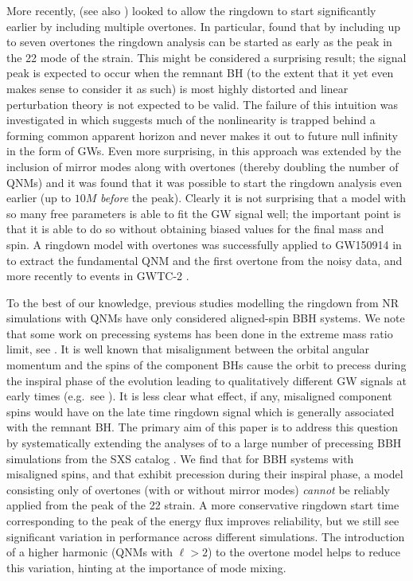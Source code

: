 More recently, \cite{overtones} (see also \cite{2020PhRvD.101j4005O}) looked to allow the ringdown to start significantly earlier by including multiple overtones. 
In particular, \cite{overtones} found that by including up to seven overtones the ringdown analysis can be started as early as the peak in the 22 mode of the strain. 
This might be considered a surprising result; the signal peak is expected to occur when the remnant BH (to the extent that it yet even makes sense to consider it as such) is most highly distorted and linear perturbation theory is not expected to be valid. 
The failure of this intuition was investigated in \cite{2020arXiv200400671O} which suggests much of the nonlinearity is trapped behind a forming common apparent horizon and never makes it out to future null infinity in the form of GWs. 
Even more surprising, in \cite{mirror_modes} this approach was extended by the inclusion of mirror modes along with overtones (thereby doubling the number of QNMs) and it was found that it was possible to start the ringdown analysis even earlier (up to ${10M}$ \emph{before} the peak). 
Clearly it is not surprising that a model with so many free parameters is able to fit the GW signal well; the important point is that it is able to do so without obtaining biased values for the final mass and spin. 
A ringdown model with overtones was successfully applied to GW150914 in \cite{tnh} to extract the fundamental QNM and the first overtone from the noisy data, and more recently to events in GWTC-2 \cite{gwtc-2_tests}. 

To the best of our knowledge, previous studies modelling the ringdown from NR simulations with QNMs have only considered aligned-spin BBH systems. 
We note that some work on precessing systems has been done in the extreme mass ratio limit, see \cite{2019PhRvL.123p1101H,2019PhRvD.100h4032L}. 
It is well known that misalignment between the orbital angular momentum and the spins of the component BHs cause the orbit to precess during the inspiral phase of the evolution leading to qualitatively different GW signals at early times (e.g.\ see \cite{1994PhRvD..49.6274A}). 
It is less clear what effect, if any, misaligned component spins would have on the late time ringdown signal which is generally associated with the remnant BH. 
The primary aim of this paper is to address this question by systematically extending the analyses of \cite{overtones, mirror_modes} to a large number of precessing BBH simulations from the SXS catalog \cite{sxs, 2013PhRvL.111x1104M}. 
We find that for BBH systems with misaligned spins, and that exhibit precession during their inspiral phase, a model consisting only of overtones (with or without mirror modes) \emph{cannot} be reliably applied from the peak of the 22 strain. 
A more conservative ringdown start time corresponding to the peak of the energy flux improves reliability, but we still see significant variation in performance across different simulations. 
The introduction of a higher harmonic (QNMs with $\ell > 2$) to the overtone model helps to reduce this variation, hinting at the importance of mode mixing.

